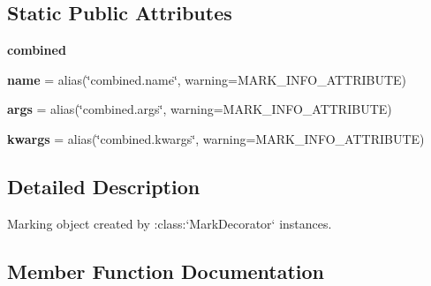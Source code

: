 \subsection*{Static Public Attributes}
\begin{DoxyCompactItemize}
\item 
{\bfseries combined}
\item 
\mbox{\label{class__pytest_1_1mark_1_1structures_1_1_mark_info_a7af7b6aee8faf464bb9d3172ae53b76f}} 
{\bfseries name} = alias(\char`\"{}combined.\+name\char`\"{}, warning=M\+A\+R\+K\+\_\+\+I\+N\+F\+O\+\_\+\+A\+T\+T\+R\+I\+B\+U\+TE)
\item 
\mbox{\label{class__pytest_1_1mark_1_1structures_1_1_mark_info_a86a6bd3f9af0dae7c2e54073106451b2}} 
{\bfseries args} = alias(\char`\"{}combined.\+args\char`\"{}, warning=M\+A\+R\+K\+\_\+\+I\+N\+F\+O\+\_\+\+A\+T\+T\+R\+I\+B\+U\+TE)
\item 
\mbox{\label{class__pytest_1_1mark_1_1structures_1_1_mark_info_adf1b764971b09285983faa8fdccfbdb5}} 
{\bfseries kwargs} = alias(\char`\"{}combined.\+kwargs\char`\"{}, warning=M\+A\+R\+K\+\_\+\+I\+N\+F\+O\+\_\+\+A\+T\+T\+R\+I\+B\+U\+TE)
\end{DoxyCompactItemize}


\subsection{Detailed Description}
\begin{DoxyVerb}Marking object created by :class:`MarkDecorator` instances. \end{DoxyVerb}
 

\subsection{Member Function Documentation}
\mbox{\label{class__pytest_1_1mark_1_1structures_1_1_mark_info_a809398f06bd8bcd96db37f37f39c9d13}} 
